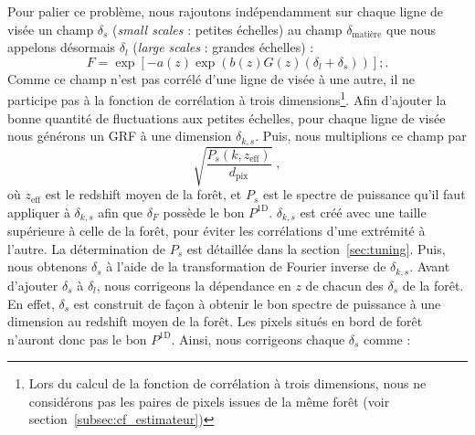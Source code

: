 Pour palier ce problème, nous rajoutons indépendamment sur chaque ligne de visée un champ $\delta_s$ (\emph{small scales} : petites échelles) au champ $\delta_{\mathrm{matière}}$ que nous appelons désormais $\delta_{l}$ (\emph{large scales} : grandes échelles) :
\begin{equation}
  \label{eq:fgpa3}
  F = \exp\left[ - a(z) \exp(b(z) G(z) (\delta_l + \delta_s))\right] ;.
\end{equation}
Comme ce champ n'est pas corrélé d'une ligne de visée à une autre, il ne participe pas à la fonction de corrélation à trois dimensions\footnote{Lors du calcul de la fonction de corrélation à trois dimensions, nous ne considérons pas les paires de pixels issues de la même forêt (voir section~\ref{subsec:cf_estimateur})}.
Afin d'ajouter la bonne quantité de fluctuations aux petites échelles, pour chaque ligne de visée nous générons un GRF à une dimension $\delta_{k,s}$.
Puis, nous multiplions ce champ par
\begin{equation}
  \sqrt{\frac{P_{s}(k,z_{\mathrm{eff}})}{d_{\mathrm{pix}}}} \; ,
\end{equation}
où $z_{\mathrm{eff}}$ est le redshift moyen de la forêt, et $P_{s}$ est le spectre de puissance qu'il faut appliquer à $\delta_{k,s}$ afin que $\delta_F$ possède le bon $P^{\mathrm{1D}}$. $\delta_{k,s}$ est créé avec une taille supérieure à celle de la forêt, pour éviter les corrélations d'une extrémité à l'autre. La détermination de $P_{s}$ est détaillée dans la section~\ref{sec:tuning}. Puis, nous obtenons $\delta_s$ à l'aide de la transformation de Fourier inverse de $\delta_{k,s}$.
  Avant d'ajouter $\delta_s$ à $\delta_l$, nous corrigeons la dépendance en $z$ de chacun des $\delta_s$ de la forêt. En effet, $\delta_s$ est construit de façon à obtenir le bon spectre de puissance à une dimension au redshift moyen de la forêt. Les pixels situés en bord de forêt n'auront donc pas le bon $P^{\mathrm{1D}}$. Ainsi, nous corrigeons chaque $\delta_s$ comme :
